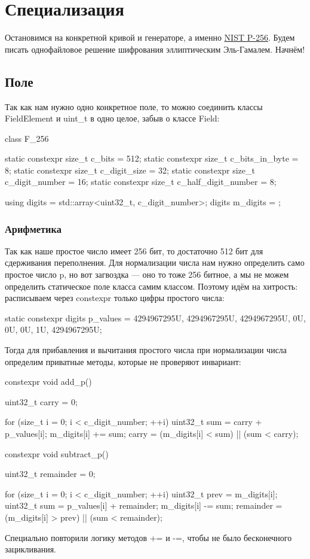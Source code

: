 
\section{Специализация}
Остановимся на конкретной кривой и генераторе, а именно \href{https://neuromancer.sk/std/nist/P-256}{NIST P-256}. Будем писать однофайловое решение шифрования эллиптическим Эль-Гамалем. Начнём!

\subsection{Поле}
Так как нам нужно одно конкретное поле, то можно соединить классы FieldElement и uint\_t в одно целое, забыв о классе Field:
\begin{cppcode}
class F_256 {
    static constexpr size_t c_bits = 512;
    static constexpr size_t c_bits_in_byte = 8;
    static constexpr size_t c_digit_size = 32;
    static constexpr size_t c_digit_number = 16;
    static constexpr size_t c_half_digit_number = 8;

    using digits = std::array<uint32_t, c_digit_number>;
    digits m_digits = {};
}
\end{cppcode}
\subsubsection{Арифметика}
Так как наше простое число имеет 256 бит, то достаточно 512 бит для сдерживания переполнения. Для нормализации числа нам нужно определить само простое число p, но вот загвоздка --- оно то тоже 256 битное, а мы не можем определить статическое поле класса самим классом. Поэтому идём на хитрость: расписываем через constexpr только цифры простого числа:
\begin{cppcode}
static constexpr digits p_values = {4294967295U, 4294967295U, 4294967295U, 0U, 0U, 0U, 1U, 4294967295U};
\end{cppcode}
Тогда для прибавления и вычитания простого числа при нормализации числа определим приватные методы, которые не проверяют инвариант:
\begin{cppcode}
constexpr void add_p() {
    uint32_t carry = 0;

    for (size_t i = 0; i < c_digit_number; ++i) {
        uint32_t sum = carry + p_values[i];
        m_digits[i] += sum;
        carry = (m_digits[i] < sum) || (sum < carry);
    }
}

constexpr void subtract_p() {
    uint32_t remainder = 0;

    for (size_t i = 0; i < c_digit_number; ++i) {
        uint32_t prev = m_digits[i];
        uint32_t sum = p_values[i] + remainder;
        m_digits[i] -= sum;
        remainder = (m_digits[i] > prev) || (sum < remainder);
    }
}
\end{cppcode}
Специально повторили логику методов += и -=, чтобы не было бесконечного зацикливания.

